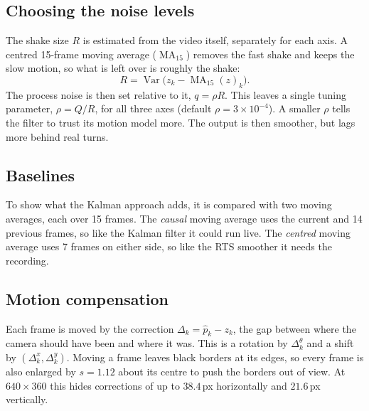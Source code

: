 \documentclass[11pt,a4paper]{article}
\begin{document}
\subsection{Choosing the noise levels}\label{sec:noise}
The shake size $R$ is estimated from the video itself, separately for each axis. A centred
15-frame moving average ($\operatorname{MA}_{15}$) removes the fast shake and keeps the slow
motion, so what is left over is roughly the shake:
\begin{equation}
  R = \operatorname{Var}\bigl(z_k - \operatorname{MA}_{15}(z)_k\bigr).
\end{equation}
The process noise is then set relative to it, $q = \rho R$. This leaves a single tuning
parameter, $\rho = Q/R$, for all three axes (default $\rho = 3\times10^{-4}$). A smaller $\rho$
tells the filter to trust its motion model more. The output is then smoother, but lags more
behind real turns.

\subsection{Baselines}
To show what the Kalman approach adds, it is compared with two moving averages, each over 15
frames. The \emph{causal} moving average uses the current and 14 previous frames, so like the
Kalman filter it could run live. The \emph{centred} moving average uses 7 frames on either side,
so like the RTS smoother it needs the recording.

\subsection{Motion compensation}\label{sec:comp}
Each frame is moved by the correction $\Delta_k = \hat p_k - z_k$, the gap between where the
camera should have been and where it was. This is a rotation by $\Delta_k^\theta$ and a shift
by $(\Delta_k^x, \Delta_k^y)$. Moving a frame leaves black borders at its edges, so every frame
is also enlarged by $s = 1.12$ about its centre to push the borders out of view. At
$640\times360$ this hides corrections of up to $38.4$\,px horizontally and $21.6$\,px
vertically.

\end{document}

